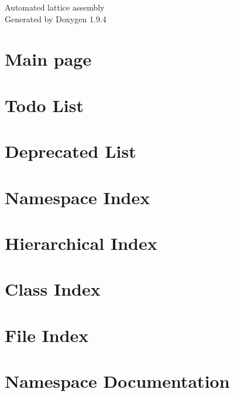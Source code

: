 \documentclass[twoside]{book}
\newcommand{\+}{\discretionary{\mbox{\scriptsize$\hookleftarrow$}}{}{}}
\newcommand{\clearemptydoublepage}{%
    \newpage{\pagestyle{empty}\cleardoublepage}%
  }
\begin{document}
  \raggedbottom
    \hypersetup{pageanchor=false,
                bookmarksnumbered=true,
                pdfencoding=unicode
               }
  \begin{titlepage}
  \vspace*{7cm}
  \begin{center}%
  {\Large Automated lattice assembly}\\
  \vspace*{1cm}
  {\large Generated by Doxygen 1.9.4}\\
  \end{center}
  \end{titlepage}
  \clearemptydoublepage
  \tableofcontents
  \clearemptydoublepage
  \hypersetup{pageanchor=true}
\chapter{Main page}
\label{index}\hypertarget{index}{}
\chapter{Todo List}
\label{todo}

\chapter{Deprecated List}
\label{deprecated}

\chapter{Namespace Index}

\chapter{Hierarchical Index}

\chapter{Class Index}

\chapter{File Index}

\chapter{Namespace Documentation}









\end{document}
